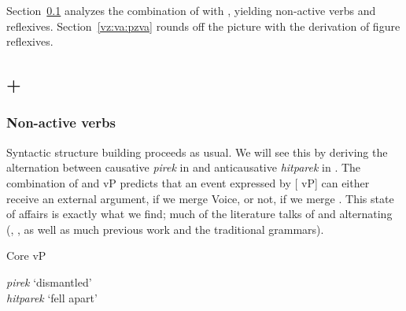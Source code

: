 Section~\ref{vz:va:vzva} analyzes the combination of {\va} with {\vz}, yielding non-active verbs and reflexives. Section~\ref{vz:va:pzva} rounds off the picture with the derivation of figure reflexives.

	\subsection{{\va} + {\vz}} \label{vz:va:vzva}
		\subsubsection{Non-active verbs} \label{vz:va:vzva:nact}
Syntactic structure building proceeds as usual. We will see this by deriving the alternation between causative \emph{pirek} in {\tpie} and anticausative \emph{hitparek} in {\thit}. The combination of {\va} and vP predicts that an event expressed by [{\va} vP] can either receive an external argument, if we merge Voice, or not, if we merge {\vz}. This state of affairs is exactly what we find; much of the literature talks of {\tpie} and {\thit} alternating (\citealt{doron03}, \citealt{arad05}, as well as much previous work and the traditional grammars).

\pex
	\a Core vP\\

	
	
	\a \emph{pirek} `dismantled'\\
	\a \emph{hitparek} `fell apart'\\
	
